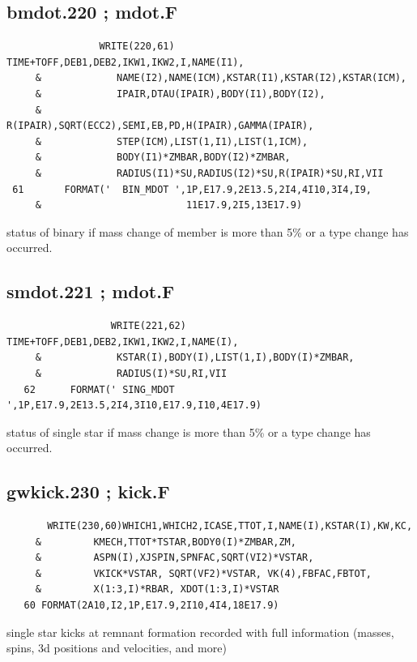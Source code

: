 \subsection{bmdot.220 ; mdot.F }
 \begin{verbatim}
                WRITE(220,61) TIME+TOFF,DEB1,DEB2,IKW1,IKW2,I,NAME(I1),
     &             NAME(I2),NAME(ICM),KSTAR(I1),KSTAR(I2),KSTAR(ICM),
     &             IPAIR,DTAU(IPAIR),BODY(I1),BODY(I2),
     &             R(IPAIR),SQRT(ECC2),SEMI,EB,PD,H(IPAIR),GAMMA(IPAIR),
     &             STEP(ICM),LIST(1,I1),LIST(1,ICM),
     &             BODY(I1)*ZMBAR,BODY(I2)*ZMBAR,
     &             RADIUS(I1)*SU,RADIUS(I2)*SU,R(IPAIR)*SU,RI,VII
 61       FORMAT('  BIN_MDOT ',1P,E17.9,2E13.5,2I4,4I10,3I4,I9,
     &                         11E17.9,2I5,13E17.9)
 \end{verbatim}

 status of binary if mass change of member is more than 5\% or a type change has occurred. 

\subsection{smdot.221 ; mdot.F }
 \begin{verbatim}
                  WRITE(221,62) TIME+TOFF,DEB1,DEB2,IKW1,IKW2,I,NAME(I),
     &             KSTAR(I),BODY(I),LIST(1,I),BODY(I)*ZMBAR,
     &             RADIUS(I)*SU,RI,VII
   62      FORMAT(' SING_MDOT ',1P,E17.9,2E13.5,2I4,3I10,E17.9,I10,4E17.9)
 \end{verbatim}

 status of single star if mass change is more than 5\% or a type change has occurred. 

\subsection{ gwkick.230 ; kick.F }
 \begin{verbatim}
       WRITE(230,60)WHICH1,WHICH2,ICASE,TTOT,I,NAME(I),KSTAR(I),KW,KC,
     &         KMECH,TTOT*TSTAR,BODY0(I)*ZMBAR,ZM,
     &         ASPN(I),XJSPIN,SPNFAC,SQRT(VI2)*VSTAR,
     &         VKICK*VSTAR, SQRT(VF2)*VSTAR, VK(4),FBFAC,FBTOT,
     &         X(1:3,I)*RBAR, XDOT(1:3,I)*VSTAR
   60 FORMAT(2A10,I2,1P,E17.9,2I10,4I4,18E17.9)
 \end{verbatim}

 single star kicks at remnant formation recorded with full information (masses, spins, 3d positions and velocities, and more)

